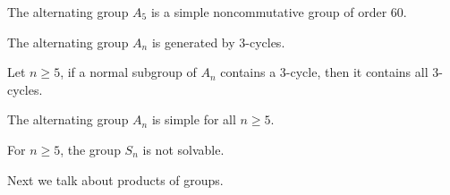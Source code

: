 \documentclass[openany]{book}
\begin{document}
\begin{cor}
    The alternating group $A_5$ is a simple noncommutative group of order 60.
\end{cor}
\begin{lem}
    The alternating group $A_n$ is generated by 3-cycles.
\end{lem}
\begin{prop}
    Let $n\geq 5$, if a normal subgroup of $A_n$ contains a 3-cycle, then it contains all 3-cycles.
\end{prop}
\begin{thm}
    The alternating group $A_n$ is simple for all $n\geq 5$.
\end{thm}
\begin{cor}
    For $n\geq 5$, the group $S_n$ is not solvable.
\end{cor}

Next we talk about products of groups.
\end{document}
